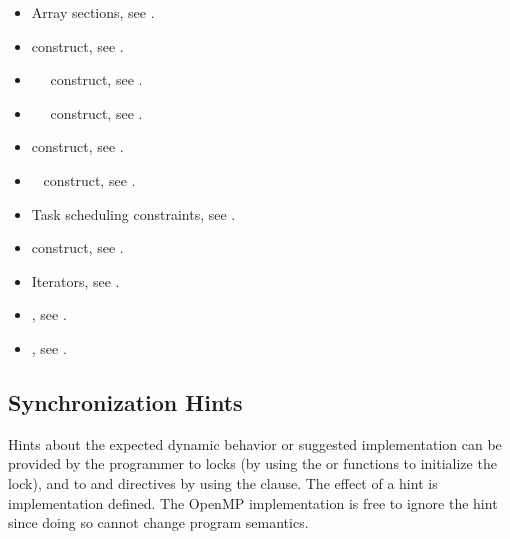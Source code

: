 \crossreferences
\begin{itemize}
\item Array sections, see
.

\item {} construct, see
.

\item {}~~ construct, see
.

\item {}~~ construct, see
.

\item {} construct, see
.

\item {}~ construct, see
.

\item Task scheduling constraints, see
.

\item {} construct, see
.

\item Iterators, see
.

\item {}, see
.

\item {}, see
.
\end{itemize}

\subsection{Synchronization Hints}
\label{subsec:Synchronization Hints}
Hints about the expected dynamic behavior or suggested implementation
can be provided by the programmer to locks (by using
the  or
 functions to initialize the lock), and to
 and  directives by using the 
clause.  The effect of a hint is implementation defined. The OpenMP
implementation is free to ignore the hint since doing so cannot change
program semantics.

